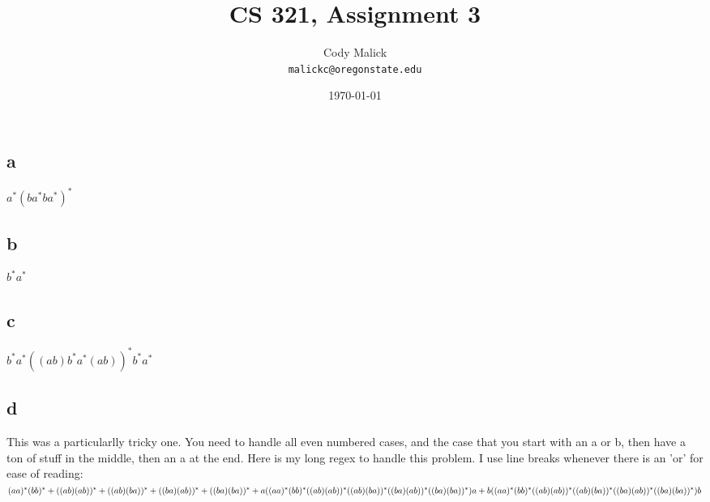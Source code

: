 \documentclass[10pt,letterpaper]{article}
\begin{document}
  \title{CS 321, Assignment 3}
  \author{Cody Malick\\
  \texttt{malickc@oregonstate.edu}}
  \date{\today}
  \maketitle

\section{}
\subsection*{a}
$a^*(ba^*ba^*)^*$
\subsection*{b}
$b^*a^*$
\subsection*{c}
$b^*a^*((ab)b^*a^*(ab))^*b^*a^*$
\subsection*{d}
This was a particularlly tricky one. You need to handle all even numbered cases,
and the case that you start with an a or b, then have a ton of stuff in the
middle, then an a at the end. Here is my long regex to handle this problem. I
use line breaks whenever there is an 'or' for ease of reading:\\
$(aa)^*(bb)^*+\\
((ab)(ab))^*+\\
((ab)(ba))^*+\\
((ba)(ab))^*+\\
((ba)(ba))^*+\\
a((aa)^*(bb)^*((ab)(ab))^*((ab)(ba))^*((ba)(ab))^*((ba)(ba))^*)a+\\
b((aa)^*(bb)^*((ab)(ab))^*((ab)(ba))^*((ba)(ab))^*((ba)(ba))^*)b$
\section{}
\section{}
\section{}
\end{document}
